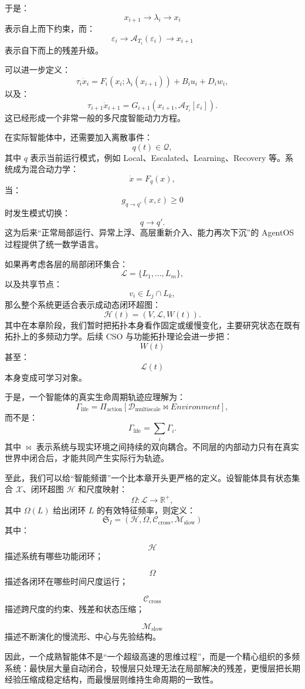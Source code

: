 于是：
\[
x_{i+1}
\rightarrow
\lambda_i
\rightarrow
x_i
\]
表示自上而下约束，而：
\[
\varepsilon_i
\rightarrow
\mathcal{A}_{T_i}(\varepsilon_i)
\rightarrow
x_{i+1}
\]
表示自下而上的残差升级。

可以进一步定义：
\[
\tau_i\dot{x}_i
=
F_i
\left(
x_i;
\lambda_i(x_{i+1})
\right)
+
B_i u_i
+
D_i w_i,
\]
以及：
\[
\tau_{i+1}
\dot{x}_{i+1}
=
G_{i+1}
\left(
x_{i+1},
\mathcal{A}_{T_i}[\varepsilon_i]
\right).
\]
这已经形成一个非常一般的多尺度智能动力方程。

在实际智能体中，还需要加入离散事件：
\[
q(t)\in\mathcal{Q},
\]
其中 $q$ 表示当前运行模式，例如 Local、Escalated、Learning、Recovery 等。系统成为混合动力学：
\[
\dot{x}
=
F_q(x),
\]
当：
\[
g_{q\rightarrow q'}(x,\varepsilon)
\geq0
\]
时发生模式切换：
\[
q\rightarrow q'.
\]
这为后来“正常局部运行、异常上浮、高层重新介入、能力再次下沉”的 AgentOS 过程提供了统一数学语言。

如果再考虑各层的局部闭环集合：
\[
\mathcal{L}
=
\{L_1,\ldots,L_m\},
\]
以及共享节点：
\[
v_i
\in
L_j\cap L_k,
\]
那么整个系统更适合表示成动态闭环超图：
\[
\mathcal{H}(t)
=
\left(
V,
\mathcal{L},
W(t)
\right).
\]
其中在本章阶段，我们暂时把拓扑本身看作固定或缓慢变化，主要研究状态在既有拓扑上的多频动力学。后续 CSO 与功能拓扑理论会进一步把：
\[
W(t)
\]
甚至：
\[
\mathcal{L}(t)
\]
本身变成可学习对象。

于是，一个智能体的真实生命周期轨迹应理解为：
\[
\Gamma_{\mathrm{life}}
=
\Pi_{\mathrm{action}}
\left[
\mathcal{D}_{\mathrm{multiscale}}
\bowtie
Environment
\right],
\]
而不是：
\[
\Gamma_{\mathrm{life}}
=
\sum_i
\Gamma_i.
\]
其中 $\bowtie$ 表示系统与现实环境之间持续的双向耦合。不同层的内部动力只有在真实世界中闭合后，才能共同产生实际行为轨迹。

至此，我们可以给“智能频谱”一个比本章开头更严格的定义。设智能体具有状态集合 $\mathcal{X}$、闭环超图 $\mathcal{H}$ 和尺度映射：
\[
\Omega:
\mathcal{L}
\rightarrow
\mathbb{R}^{+},
\]
其中 $\Omega(L)$ 给出闭环 $L$ 的有效特征频率，则定义：
\[
\boxed{
\mathfrak{S}_I
=
\left(
\mathcal{H},
\Omega,
\mathcal{C}_{\mathrm{cross}},
\mathcal{M}_{\mathrm{slow}}
\right)
}
\]
其中：

\[
\mathcal{H}
\]
描述系统有哪些功能闭环；

\[
\Omega
\]
描述各闭环在哪些时间尺度运行；

\[
\mathcal{C}_{\mathrm{cross}}
\]
描述跨尺度的约束、残差和状态压缩；

\[
\mathcal{M}_{\mathrm{slow}}
\]
描述不断演化的慢流形、中心与先验结构。

因此，一个成熟智能体不是“一个超级高速的思维过程”，而是一个精心组织的多频系统：最快层大量自动闭合，较慢层只处理无法在局部解决的残差，更慢层把长期经验压缩成稳定结构，而最慢层则维持生命周期的一致性。

